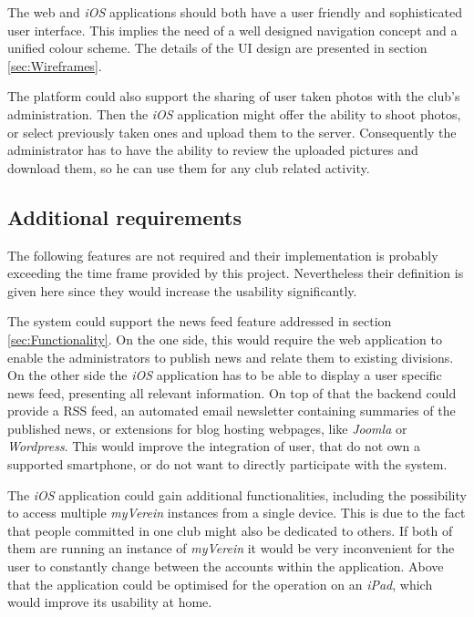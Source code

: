 The web and \emph{iOS} applications should both have a user friendly and sophisticated user interface. This implies the need of a well designed navigation concept and a unified colour scheme. The details of the \gls{UI} design are presented in section \vref{sec:Wireframes}. 

The platform could also support the sharing of user taken photos with the club's administration. Then the \emph{iOS} application might offer the ability to shoot photos, or select previously taken ones and upload them to the server. Consequently the administrator has to have the ability to review the uploaded pictures and download them, so he can use them for any club related activity.

\subsection{Additional requirements}
\label{sec:AdditionalReq}

The following features are not required and their implementation is probably exceeding the time frame provided by this project. Nevertheless their definition is given here since they would increase the usability significantly. 

The system could support the news feed feature addressed in section \vref{sec:Functionality}. On the one side, this would require the web application to enable the administrators to publish news and relate them to existing divisions. On the other side the \emph{iOS} application has to be able to display a user specific news feed, presenting all relevant information. On top of that the backend could provide a \gls{RSS} feed, an automated email newsletter containing summaries of the published news, or extensions for blog hosting webpages, like \emph{Joomla} or \emph{Wordpress}. This would improve the integration of user, that do not own a supported smartphone, or do not want to directly participate with the system.

The \emph{iOS} application could gain additional functionalities, including the possibility to access multiple \emph{myVerein} instances from a single device. This is due to the fact that people committed in one club might also be dedicated to others. If both of them are running an instance of \emph{myVerein} it would be very inconvenient for the user to constantly change between the accounts within the application. Above that the application could be optimised for the operation on an \emph{iPad}, which would improve its usability at home.

